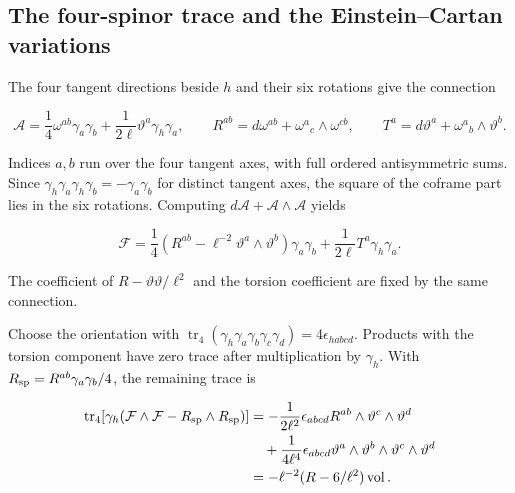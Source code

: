 \documentclass[aps,prx,onecolumn,10pt,notitlepage,nofootinbib,longbibliography]{revtex4-2}
\numberwithin{equation}{section}
\numberwithin{table}{section}
\begin{document}
\subsection{The four-spinor trace and the Einstein--Cartan variations}\label{the-four-spinor-trace-and-the-einsteincartan-variations}

The four tangent directions beside \(h\) and their six rotations give the connection

\begin{equation}
 \mathcal A=\frac14\omega^{ab}\gamma_a\gamma_b
      +\frac1{2\ell}\vartheta^a\gamma_h\gamma_a,
 \qquad R^{ab}=d\omega^{ab}+\omega^a{}_c\wedge\omega^{cb},
 \qquad T^a=d\vartheta^a+\omega^a{}_b\wedge \vartheta^b.
 \label{eq:proof-SE-1}
\end{equation}

Indices \(a,b\) run over the four tangent axes, with full ordered antisymmetric sums. Since \(\gamma_h\gamma_a\gamma_h\gamma_b=-\gamma_a\gamma_b\) for distinct tangent axes, the square of the coframe part lies in the six rotations. Computing \(d\mathcal A+\mathcal A\wedge\mathcal A\) yields

\begin{equation}
 \mathcal F=\frac14(R^{ab}-\ell^{-2}\vartheta^a\wedge \vartheta^b)\gamma_a\gamma_b
       +\frac1{2\ell}T^a\gamma_h\gamma_a.
 \label{eq:proof-SE-2}
\end{equation}

The coefficient of \(R-\vartheta\vartheta/\ell^2\) and the torsion coefficient are fixed by the same connection.

Choose the orientation with \(\operatorname{tr}_4(\gamma_h\gamma_a\gamma_b\gamma_c\gamma_d)=4\epsilon_{habcd}\). Products with the torsion component have zero trace after multiplication by \(\gamma_h\). With \(R_{\rm sp}=R^{ab}\gamma_a\gamma_b/4\), the remaining trace is

\begin{equation}
 \begin{aligned}
 \operatorname{tr}_4[\gamma_h(\mathcal F\wedge\mathcal F
                       -R_{\rm sp}\wedge R_{\rm sp})]
  &=-\frac1{2\ell^2}\epsilon_{abcd}R^{ab}\wedge \vartheta^c\wedge \vartheta^d\\
  &\quad+\frac1{4\ell^4}\epsilon_{abcd}\vartheta^a\wedge \vartheta^b\wedge \vartheta^c\wedge \vartheta^d\\
  &=-\ell^{-2}(R-6/\ell^2)\operatorname{vol}.
 \end{aligned}
 \label{eq:proof-SE-3}
\end{equation}
\end{document}
